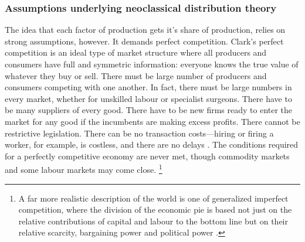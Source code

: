\subsubsection{Assumptions underlying neoclassical distribution theory}
The idea that each \gls{factor of production} gets it's share of production, relies on 
strong assumptions, however.  It demands perfect competition. 
Clark's \Gls{perfect competition} is an ideal type of market structure where all producers and consumers have full and symmetric information: everyone knows the true value of whatever they buy or sell. %
There must be large number of producers and consumers competing with one another. In fact, there must be large numbers in every market, whether for unskilled labour or specialist surgeons. There have to be many suppliers of every good. %
There have to be new firms ready to enter the market for any good if the incumbents are making excess profits. There cannot be restrictive legislation. %
There can be no transaction costs---hiring or firing a worker, for example, is costless, and there are no delays \cite{GET_perfect_competition}. The conditions required for a perfectly competitive economy are never met, though \gls{commodity} markets and some labour markets may come close.%
\footnote{ 
 A far more realistic description of the world is one of generalized  \gls{imperfect competition}, where the division of the economic pie is based not just on the relative contributions of capital and labour to the bottom line but on their relative \gls{scarcity}, bargaining power and political power \cite{GET_imperfect_competition}.}  %


